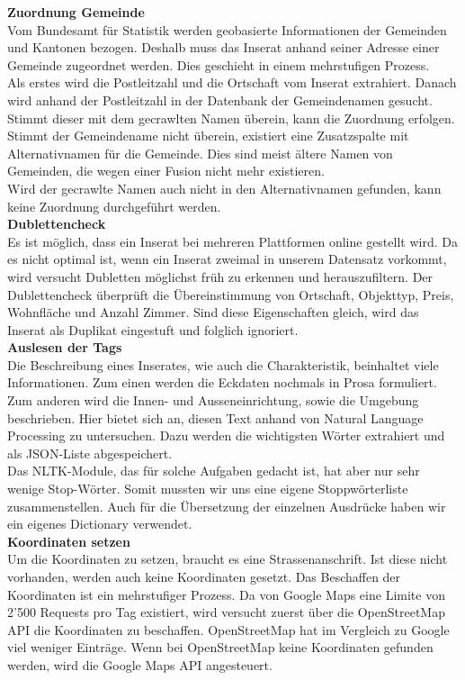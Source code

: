\textbf{Zuordnung Gemeinde}\\
Vom Bundesamt für Statistik werden geobasierte Informationen der Gemeinden und Kantonen bezogen. Deshalb muss das Inserat anhand seiner Adresse einer Gemeinde zugeordnet werden. Dies geschieht in einem mehrstufigen Prozess.\\
Als erstes wird die Postleitzahl und die Ortschaft vom Inserat extrahiert. Danach wird anhand der Postleitzahl in der Datenbank der Gemeindenamen gesucht. Stimmt dieser mit dem gecrawlten Namen überein, kann die Zuordnung erfolgen.\\
Stimmt der Gemeindename nicht überein, existiert eine Zusatzspalte mit Alternativnamen für die Gemeinde.  Dies sind meist ältere Namen von Gemeinden, die wegen einer Fusion nicht mehr existieren.\\
Wird der gecrawlte Namen auch nicht in den Alternativnamen gefunden, kann keine Zuordnung durchgeführt werden.\\[2ex]
%
\textbf{Dublettencheck}\\
Es ist möglich, dass ein Inserat bei mehreren Plattformen online gestellt wird. Da es nicht optimal ist, wenn ein Inserat zweimal in unserem Datensatz vorkommt, wird versucht Dubletten möglichst früh zu erkennen und herauszufiltern. Der Dublettencheck überprüft die Übereinstimmung von Ortschaft, Objekttyp, Preis, Wohnfläche und Anzahl Zimmer. Sind diese Eigenschaften gleich, wird das Inserat als Duplikat eingestuft und folglich ignoriert.\\[2ex]
%
\textbf{Auslesen der Tags}\\
Die Beschreibung eines Inserates, wie auch die Charakteristik, beinhaltet viele Informationen. Zum einen werden die Eckdaten nochmals in Prosa formuliert. Zum anderen wird die Innen- und Ausseneinrichtung, sowie die Umgebung beschrieben. Hier bietet sich an, diesen Text anhand von Natural Language Processing zu untersuchen. Dazu werden die wichtigsten Wörter extrahiert und als JSON-Liste abgespeichert.\\
Das NLTK-Module, das für solche Aufgaben gedacht ist, hat aber nur sehr wenige Stop-Wörter. Somit mussten wir uns eine eigene Stoppwörterliste zusammenstellen. Auch für die Übersetzung der einzelnen Ausdrücke haben wir ein eigenes Dictionary verwendet.\\[2ex]
%
\textbf{Koordinaten setzen}\\
Um die Koordinaten zu setzen, braucht es eine Strassenanschrift. Ist diese nicht vorhanden, werden auch keine Koordinaten gesetzt. Das Beschaffen der Koordinaten ist ein mehrstufiger Prozess. Da von Google Maps eine Limite von 2'500 Requests pro Tag existiert, wird versucht zuerst über die OpenStreetMap API die Koordinaten zu beschaffen. OpenStreetMap hat im Vergleich zu Google viel weniger Einträge. Wenn bei OpenStreetMap keine Koordinaten gefunden werden, wird die Google Maps API angesteuert.\\[2ex]
